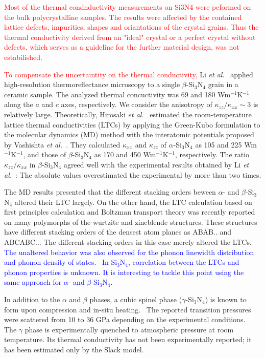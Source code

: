 \documentclass[twocolumn,amsmath,amssymb,a4paper,prb,superscriptaddress,floatfix]{revtex4-1}
\begin{document}
\textcolor{red}{Most of the thermal condnductivity measurements on Si3N4 were peformed on the
bulk polycrystalline samples.  The results were affected by the contained
lattice defects, impurities, shapes and oriantations of the crystal grains.  Thus
the thermal conductivity derived from an "ideal" crystal or a perfect crystal
without defects, which serves as a guideline for the further material design, was not estabilished.}

\textcolor{red}{To compensate the uncertaintity on the thermal conductivity,}
Li {\it et al.}~\cite{li} applied high-resolution thermoreflectance
microscopy to a single $\beta$-Si$_3$N$_4$ grain in a ceramic sample. The analyzed thermal concuctivity 
was 69 and 180 Wm$^{-1}$K$^{-1}$ along the $a$ and $c$ axes, respectively. We consider the anisotropy of $\kappa_{zz}/\kappa_{xx}\sim 3$ is
relatively large.  
Theoretically, Hirosaki {\it et al.}~\cite{hirosaki-md} estimated the room-temperature lattice
thermal conductivities (LTCs) by
applying the Green-Kubo formulation to the molecular dynamics (MD) method with
the interatomic potentials proposed by Vashishta {\it et al.}~\cite{vashishta}. 
They calculated $\kappa$$_{xx}$ and $\kappa$$_{zz}$ of
$\alpha$-Si$_3$N$_4$ as 105 and 225 Wm$^{-1}$K$^{-1}$, and those of
$\beta$-Si$_3$N$_4$ as 170 and 450 Wm$^{-1}$K$^{-1}$, respectively.
The ratio $\kappa_{zz}/\kappa_{xx}$ in $\beta$-Si$_3$N$_4$ agreed well with the experimental results 
obtained by Li {\it et al.}~\cite{li}: The absolute values overestimated the experimental by more than two times. 

The MD results presented that the different stacking orders beween $\alpha$-
and $\beta$-Si$_3$N$_4$ altered their LTC largely.
On the other hand, the LTC calculation
based on first principles calculation and Boltzman transport theory was recently reported on 
many polymorphs of the wurtzite and zincblende structures. These structures have
different stacking orders of the densest atom planes as ABAB.. and ABCABC...
The different stacking orders in this case merely altered the LTCs.~\cite{phono3py} \textcolor{blue}{The
unaltered behavior was also observed for the phonon linewidth distribution and
phonon density of states.~\cite{phono3py} In Si$_3$N$_4$, correlation
between the LTCs and phonon properties is unknown.  It is interesting
to tackle this point using the same approach for $\alpha$- and $\beta$-Si$_3$N$_4$.}

In addition to the $\alpha$ and $\beta$ phases, a cubic spinel phase ($\gamma$-Si$_3$N$_4$) is known to form
upon compression and in-situ heating.~\cite{zerr,zhang} The reported
transition pressures were scattered from 10 to 36 GPa depending on the
experimental conditions.~\cite{xu}  The $\gamma$ phase is
experimentally quenched to atmospheric pressure at room temperature.  Its
thermal conductivity has not been experimentally reported; it has been
estimated only by the Slack model.~\cite{morelli} 
\end{document}
